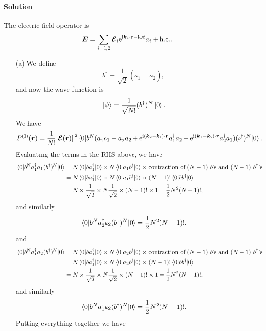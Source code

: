 \documentclass[hyperref, a4paper]{article}
\newcommand*{\ii}{\mathrm{i}}
\newcommand*{\ee}{\mathrm{e}}
\begin{document}
\paragraph{Solution} The electric field operator is 
\begin{equation}
    \vb*{E} = \sum_{i=1, 2} \vb*{\mathcal{E}}_i \ee^{\ii \vb*{k}_i \cdot \vb*{r} - \ii \omega t} a_i + \text{h.c.}. 
\end{equation}
\begin{itemize}
\item[(a)] We define 
\[
    b^\dagger = \frac{1}{\sqrt{2}} (a_1^\dagger + a_2^\dagger),
\] 
and now the wave function is 
\[
    \ket*{\psi} = \frac{1}{\sqrt{N!}} (b^\dagger)^N \ket*{0}.
\]
We have 
\[
    P^{(1)}(\vb*{r}) = \frac{1}{N!} \abs*{\vb*{\mathcal{E}} (\vb*{r})}^2 
    \expval*{b^N (a_1^\dagger a_1 + a_2^\dagger a_2 + \ee^{\ii (\vb*{k}_2 - \vb*{k}_1) \cdot \vb*{r}} a_1^\dagger a_2 + \ee^{\ii (\vb*{k}_1 - \vb*{k}_2) \cdot \vb*{r}} a_2^\dagger a_1 ) (b^\dagger)^N}{0} .
\]
Evaluating the terms in the RHS above, we have 
\[
    \begin{aligned}
        \expval*{b^N a_1^\dagger a_1 (b^\dagger)^N}{0} &= N \expval*{b a_1^\dagger}{0} \times N \expval*{a_1 b^\dagger}{0} 
        \times \text{contraction of $(N-1)$ $b$'s and $(N-1)$ $b^\dagger$'s} \\
        &= N \expval*{b a_1^\dagger}{0} \times N \expval*{a_1 b^\dagger}{0} \times (N-1)! \expval*{b b^\dagger}{0} \\
        &= N \times \frac{1}{\sqrt{2}} \times N \frac{1}{\sqrt{2}} \times (N-1)! \times 1 = \frac{1}{2} N^2 (N-1)!,
    \end{aligned}
\]
and similarly 
\[
    \expval*{b^N a_2^\dagger a_2 (b^\dagger)^N}{0} = \frac{1}{2} N^2 (N-1)!,
\]
and 
\[
    \begin{aligned}
        \expval*{b^N a_1^\dagger a_2 (b^\dagger)^N}{0} &= N \expval*{b a_1^\dagger}{0} \times N \expval*{a_2 b^\dagger}{0} 
        \times \text{contraction of $(N-1)$ $b$'s and $(N-1)$ $b^\dagger$'s} \\
        &= N \expval*{b a_1^\dagger}{0} \times N \expval*{a_2 b^\dagger}{0} \times (N-1)! \expval*{b b^\dagger}{0} \\
        &= N \times \frac{1}{\sqrt{2}} \times N \frac{1}{\sqrt{2}} \times (N-1)! \times 1 = \frac{1}{2} N^2 (N-1)!,
    \end{aligned}
\]
and similarly 
\[
    \expval*{b^N a_1^\dagger a_2 (b^\dagger)^N}{0} = \frac{1}{2} N^2 (N-1)!.
\]
Putting everything together we have 
\[
    \begin{aligned}

\end{aligned}\]
\end{itemize}
\end{document}

